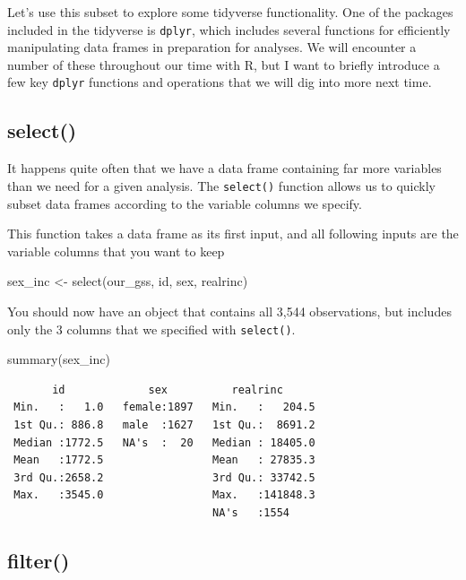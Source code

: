 \documentclass[
  letterpaper,
  DIV=11,
  numbers=noendperiod]{scrreprt}
\newenvironment{Shaded}{\begin{snugshade}}{\end{snugshade}}
\newcommand{\FunctionTok}[1]{\textcolor[rgb]{0.28,0.35,0.67}{#1}}
\newcommand{\NormalTok}[1]{\textcolor[rgb]{0.00,0.23,0.31}{#1}}
\newcommand{\OtherTok}[1]{\textcolor[rgb]{0.00,0.23,0.31}{#1}}
\begin{document}
Let's use this subset to explore some tidyverse functionality. One of
the packages included in the tidyverse is \texttt{dplyr}, which includes
several functions for efficiently manipulating data frames in
preparation for analyses. We will encounter a number of these throughout
our time with R, but I want to briefly introduce a few key
\texttt{dplyr} functions and operations that we will dig into more next
time.

\subsection{select()}\label{select}

It happens quite often that we have a data frame containing far more
variables than we need for a given analysis. The \texttt{select()}
function allows us to quickly subset data frames according to the
variable columns we specify.

This function takes a data frame as its first input, and all following
inputs are the variable columns that you want to keep

\begin{Shaded}
\begin{Highlighting}[]
\NormalTok{sex\_inc }\OtherTok{\textless{}{-}} \FunctionTok{select}\NormalTok{(our\_gss, id, sex, realrinc)}
\end{Highlighting}
\end{Shaded}

You should now have an object that contains all 3,544 observations, but
includes only the 3 columns that we specified with \texttt{select()}.

\begin{Shaded}
\begin{Highlighting}[]
\FunctionTok{summary}\NormalTok{(sex\_inc)}
\end{Highlighting}
\end{Shaded}

\begin{verbatim}
       id             sex          realrinc       
 Min.   :   1.0   female:1897   Min.   :   204.5  
 1st Qu.: 886.8   male  :1627   1st Qu.:  8691.2  
 Median :1772.5   NA's  :  20   Median : 18405.0  
 Mean   :1772.5                 Mean   : 27835.3  
 3rd Qu.:2658.2                 3rd Qu.: 33742.5  
 Max.   :3545.0                 Max.   :141848.3  
                                NA's   :1554      
\end{verbatim}

\subsection{filter()}\label{filter}
\end{document}
